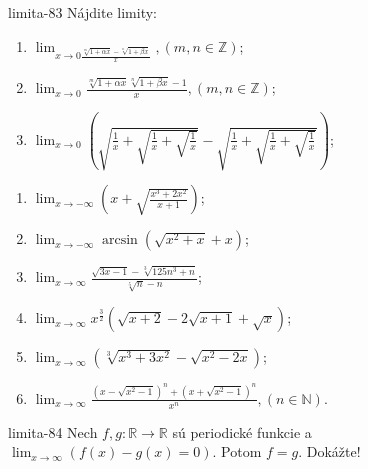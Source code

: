 \begin{defproblem}{limita-83}
Nájdite limity:
\begin{enumerate}
\item $\lim_{x \rightarrow 0 \frac{\sqrt[m]{1+\alpha x}-\sqrt[n]{1+\beta x}}{x}},(m,n \in \mathbb{Z})$;
\item $\lim_{x \rightarrow 0}  \frac{\sqrt[m]{1+\alpha x}\sqrt[n]{1+\beta x}-1}{x},(m,n \in \mathbb{Z})$;
\item $\lim_{x \rightarrow 0} (\sqrt{\frac{1}{x}+\sqrt{\frac{1}{x}+\sqrt{\frac{1}{x}}}}-\sqrt{\frac{1}{x}+\sqrt{\frac{1}{x}+\sqrt{\frac{1}{x}}}})$;
\end{enumerate}
\begin{multicols}{2}
\begin{enumerate}[resume]
    \item $\lim_{x \rightarrow -\infty} (x+\sqrt{\frac{x^3+2x^2}{x+1}})$;
    \item $\lim_{x \rightarrow -\infty} \arcsin (\sqrt{x^2+x}+x)$;
    \item $\lim_{x \rightarrow \infty} \frac{\sqrt{3x-1}-\sqrt[3]{125n^3+n}}{\sqrt[5]{n}-n}$;
    \item $\lim_{x \rightarrow \infty} x^{\frac{3}{2}}(\sqrt{x+2}-2\sqrt{x+1}+\sqrt{x})$;
    \item $\lim_{x \rightarrow \infty} (\sqrt[3]{x^3+3x^2}-\sqrt{x^2-2x})$;
    \item $\lim_{x \rightarrow \infty} \frac{(x-\sqrt{x^2-1})^n+(x+\sqrt{x^2-1})^n}{x^n}, (n \in \mathbb{N})$.
\end{enumerate}
\end{multicols}
\end{defproblem}

\begin{defproblem}{limita-84}
Nech $f,g: \mathbb{R} \rightarrow \mathbb{R}$ sú periodické funkcie a $\lim_{x \rightarrow \infty} (f(x)-g(x)=0)$. Potom $f=g$. Dokážte!
\end{defproblem}

